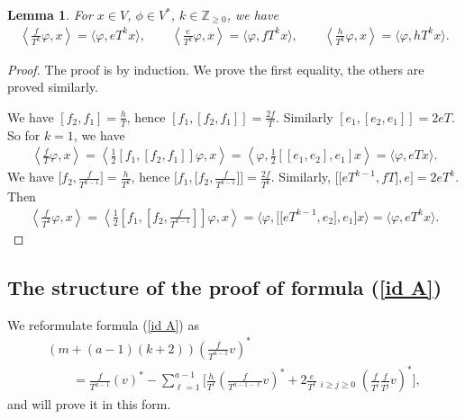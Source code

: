 \documentclass[11pt]{article}
\numberwithin{equation}{section}
\newtheorem{lem}[thm]{Lemma}
\begin{document}
\begin{lem} \label{lem pere} For $x\in V$, $\phi\in V^*$, $k\in{\mathbb Z}_{\geq 0}$, we have
\begin{gather*}
\left\langle \frac{f}{T^k} \varphi, x \right\rangle = \big\langle \varphi, eT^k x \big\rangle,
 \qquad \left\langle \frac{e}{T^k} \varphi, x \right\rangle = \big\langle \varphi, fT^k x \big\rangle, \qquad
\left\langle \frac{h}{T^k} \varphi, x \right\rangle = \big\langle \varphi, hT^k x \big\rangle. %
\end{gather*}
\end{lem}
\begin{proof}The proof is by induction. We prove the first equality, the others are proved similarly.

We have $[f_2, f_1] = \frac{h}{T}$, hence $[f_1, [f_2, f_1]] = \frac{2f}{T}$. Similarly
 $[e_1, [e_2, e_1]] = 2e T$. So for $k=1$, we have
\begin{gather*}
\left\langle \frac{f}{T} \varphi, x \right\rangle = \left\langle \frac{1}{2} [f_1, [f_2, f_1]] \varphi, x \right\rangle = \left\langle \varphi, \frac{1}{2} [[e_1, e_2], e_1] x \right\rangle = \langle \varphi, eT x \rangle.
\end{gather*}
We have $\big[f_2, \frac{f}{T^{k-1}}\big] = \frac{h}{T^k}$, hence $\big[f_1, \big[f_2, \frac{f}{T^{k-1}} \big]\big] = \frac{2f}{T^k}$. Similarly, $\big[\big[eT^{k-1},fT\big], e\big] = 2e T^k$. Then
\begin{gather*}
\left\langle \frac{f}{T^k} \varphi, x \right\rangle = \left\langle \frac 12 \left[f_1, \left[f_2, \frac{f}{T^{k-1}}\right]\right] \varphi, x \right\rangle = \big\langle \varphi, \big[\big[eT^{k-1},e_2\big], e_1\big] x \big\rangle = \big\langle \varphi, eT^k x \big\rangle.\tag*{\qed}
\end{gather*}\renewcommand{\qed}{}
\end{proof}


\subsection{The structure of the proof of formula (\ref{id A})}\label{subsec structure} We reformulate formula (\ref{id A}) as
\begin{gather}
(m+(a-1)(k+2))\left(\frac{f}{T^{a-1}}v\right)^* \nonumber\\
\qquad{} =\frac{f}{T^{a-1}} (v)^* - \sum_{\ell=1}^{a-1}\bigg[\frac{h}{T^\ell}\left(\frac{f}{T^{a-1-\ell}}v\right)^* + 2 \frac{e}{T^\ell}\mathop{\sum_{i+j=a-1-\ell}}_{i\geq j\geq 0} \left(\frac{f}{T^i}\frac{f}{T^j}v\right)^*\bigg], \label{AA}
\end{gather}
and will prove it in this form.
\end{document}
